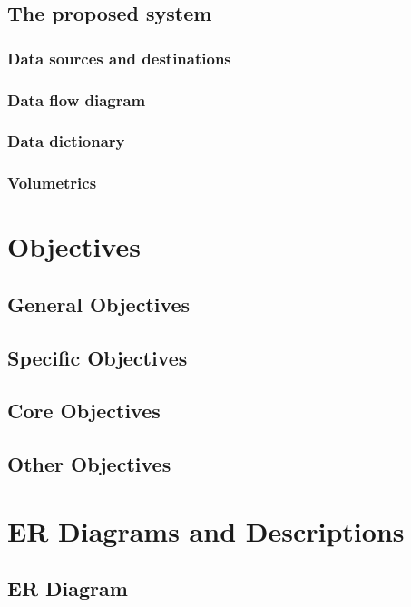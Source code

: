 \subsection{The proposed system}

\subsubsection{Data sources and destinations} 

\subsubsection{Data flow diagram}

\subsubsection{Data dictionary}

\subsubsection{Volumetrics}

\section{Objectives}

\subsection{General Objectives}

\subsection{Specific Objectives}

\subsection{Core Objectives}

\subsection{Other Objectives}

\section{ER Diagrams and Descriptions}

\subsection{ER Diagram}

